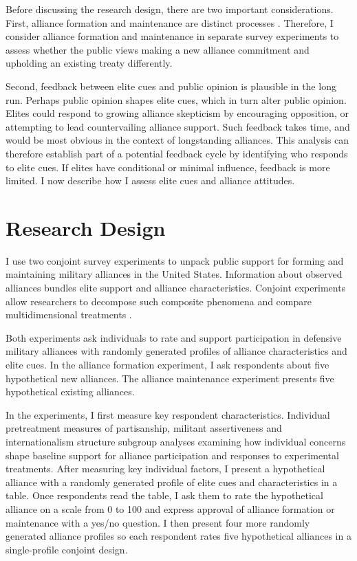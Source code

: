 \documentclass[12pt]{article}
\begin{document}
Before discussing the research design, there are two important considerations. 
First, alliance formation and maintenance are distinct processes \citep{Snyder1997}. 
Therefore, I consider alliance formation and maintenance in separate survey experiments to assess whether the public views making a new alliance commitment and upholding an existing treaty differently. 


Second, feedback between elite cues and public opinion is plausible in the long run. 
Perhaps public opinion shapes elite cues, which in turn alter public opinion. 
Elites could respond to growing alliance skepticism by encouraging opposition, or attempting to lead countervailing alliance support.
Such feedback takes time, and would be most obvious in the context of longstanding alliances.
This analysis can therefore establish part of a potential feedback cycle by identifying who responds to elite cues.  
If elites have conditional or minimal influence, feedback is more limited.
I now describe how I assess elite cues and alliance attitudes. 


\section{Research Design}


I use two conjoint survey experiments to unpack public support for forming and maintaining military alliances in the United States. 
Information about observed alliances bundles elite support and alliance characteristics. 
Conjoint experiments allow researchers to decompose such composite phenomena and compare multidimensional treatments \citep{Hainmuelleretal2014}. 


Both experiments ask individuals to rate and support participation in defensive military alliances with randomly generated profiles of alliance characteristics and elite cues. 
In the alliance formation experiment, I ask respondents about five hypothetical new alliances. 
The alliance maintenance experiment presents five hypothetical existing alliances.


In the experiments, I first measure key respondent characteristics.  
Individual pretreatment measures of partisanship, militant assertiveness and internationalism structure subgroup analyses examining how individual concerns shape baseline support for alliance participation and responses to experimental treatments. 
After measuring key individual factors, I present a hypothetical alliance with a randomly generated profile of elite cues and characteristics in a table.
Once respondents read the table, I ask them to rate the hypothetical alliance on a scale from 0 to 100 and express approval of alliance formation or maintenance with a yes/no question. 
I then present four more randomly generated alliance profiles so each respondent rates five hypothetical alliances in a single-profile conjoint design.
\end{document}

